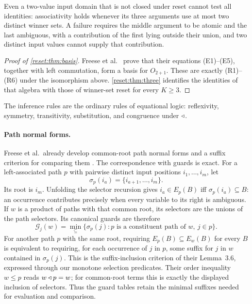 Even a two-value input domain that is not closed under reset cannot test all identities: associativity holds whenever its three arguments use at most two distinct winner sets. A failure requires the middle argument to be atomic and the last ambiguous, with a contribution of the first
lying outside their union, and two distinct input values cannot supply that contribution.

\begin{proof}[Proof of \cref{reset:thm:basis}]
Freese et al.\ \cite[Theorem~3.7]{FreeseEtAl2002} prove that their
equations (E1)--(E5), together with left commutation, form a basis for
$O_{2+1}$. These are exactly (R1)--(R6) under the isomorphism above.
\cref{reset:thm:three} identifies the identities of that algebra with
those of winner-set reset for every $K\geq3$.
\end{proof}

The inference rules are the ordinary rules of equational logic: reflexivity, symmetry, transitivity, substitution, and congruence under $\mathbin{\triangleleft}$.

\paragraph{Path normal forms.}
Freese et al.\ already develop common-root path normal forms and a
suffix criterion for comparing them
\cite[Lemmas~3.5--3.6]{FreeseEtAl2002}. The correspondence with guards
is exact. For a left-associated path $p$ with pairwise distinct input
positions $i_1,\ldots,i_m$, let
\[
 \sigma_p(i_a)=\{i_{a+1},\ldots,i_m\}.
\]
Its root is $i_m$. Unfolding the selector recursion gives
$i_a\in E_p(B)$ iff $\sigma_p(i_a)\subseteq B$: an occurrence
contributes precisely when every variable to its right is ambiguous.
If $w$ is a product of paths with that common root, its selectors are
the unions of the path selectors. Its canonical guards are therefore
\[
 \mathcal G_j(w)=\min_{\subseteq}
     \{\sigma_p(j):p\text{ is a constituent path of }w,\ j\in p\}.
\]
For another path $p$ with the same root, requiring
$E_p(B)\subseteq E_w(B)$ for every $B$ is equivalent to requiring,
for each occurrence of $j$ in $p$,
some suffix for $j$ in $w$ contained in $\sigma_p(j)$. This is the
suffix-inclusion criterion of their Lemma~3.6, expressed through our
monotone selection predicates. Their order inequality $w\leq p$ reads
$w\mathbin{\triangleleft} p=w$; for common-root terms this is exactly the displayed
inclusion of selectors. Thus the guard tables retain the minimal suffixes needed for evaluation and comparison.

